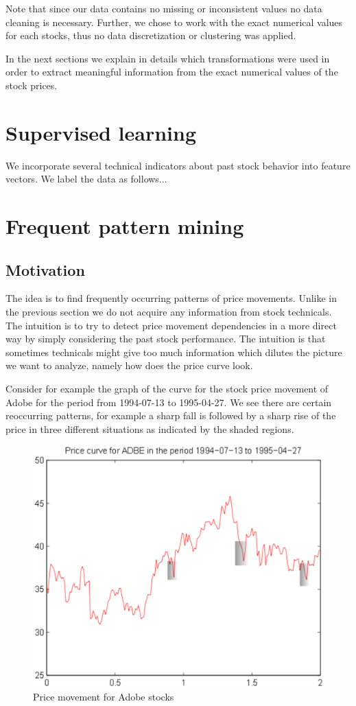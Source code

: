 \documentclass{llncs}
\begin{document}
Note that since our data contains no missing or inconsistent values no data cleaning is necessary. Further, we chose to work with the exact numerical values for each stocks, thus no data discretization or clustering was applied.

In the next sections we explain in details which transformations were used in order to extract meaningful information from the exact numerical values of the stock prices.
\section*{Supervised learning}
We incorporate several technical indicators about past stock behavior into feature vectors. We label the data as follows...
 
\section*{Frequent pattern mining}
\subsection*{Motivation}
The idea is to find frequently occurring patterns of price movements. Unlike in the previous section we do not acquire any information from stock technicals. The intuition is to try to detect price movement dependencies in a more direct way by simply considering the past stock performance. The intuition is that sometimes technicals might give too much information which dilutes the picture we want to analyze, namely how does the price curve look.

Consider for example the graph of the curve for the stock price movement of Adobe for the period from 1994-07-13 to 1995-04-27. We see there are certain reoccurring patterns, for example a sharp fall is followed by a sharp rise of the price in three different situations as indicated by the shaded regions. 

\begin{figure}[htb!]
\caption{Price movement for Adobe stocks}
\centering%
\includegraphics[scale=0.5]{ADBE_new.eps}
\end{figure}
\end{document}
